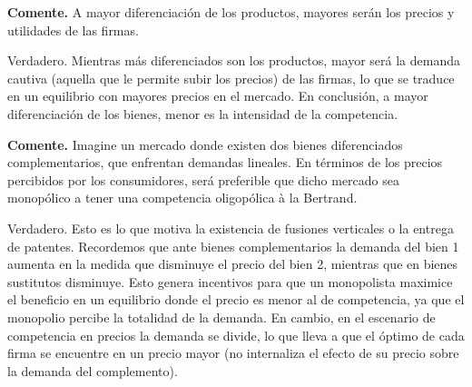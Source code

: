 \begin{parts}
\begin{solution}
\end{solution}
\end{parts}

\question \textbf{Comente.} A mayor diferenciación de los productos, mayores serán los precios y utilidades de las firmas.
\begin{solution}
Verdadero. Mientras más diferenciados son los productos, mayor será la demanda cautiva (aquella que le permite subir los precios) de las firmas, lo que se traduce en un equilibrio con mayores precios en el mercado. En conclusión, a mayor diferenciación de los bienes, menor es la intensidad de la competencia.

\end{solution}

\question \textbf{Comente.} Imagine un mercado donde existen dos bienes diferenciados complementarios, que enfrentan demandas lineales. En términos de los precios percibidos por los consumidores, será preferible que dicho mercado sea monopólico a tener una competencia oligopólica à la Bertrand.
\begin{solution}
Verdadero. Esto es lo que motiva la existencia de fusiones verticales o la entrega de patentes. Recordemos que ante bienes complementarios la demanda del bien 1 aumenta en la medida que disminuye el precio del bien 2, mientras que en bienes sustitutos disminuye. Esto genera incentivos para que un monopolista maximice el beneficio en un equilibrio donde el precio es menor al de competencia, ya que el monopolio percibe la totalidad de la demanda. En cambio, en el escenario de competencia en precios la demanda se divide, lo que lleva a que el óptimo de cada firma se encuentre en un precio mayor (no internaliza el efecto de su precio sobre la demanda del complemento).

\end{solution}

